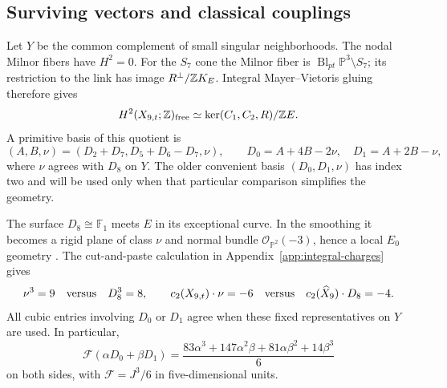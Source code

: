 \subsection{Surviving vectors and classical couplings}

Let $Y$ be the common complement of small singular neighborhoods.
The nodal Milnor fibers have $H^2=0$. For the $S_7$ cone the Milnor
fiber is $\operatorname{Bl}_{pt}\mathbb P^3\setminus S_7$;
its restriction to the link has image $R^\perp/\mathbb Z K_E$.
Integral Mayer--Vietoris gluing therefore gives
\begin{equation}
 H^2(X_{9,t};\mathbb Z)_{\rm free}
 \simeq \ker(C_1,C_2,R)/\mathbb Z E.
 \label{eq:x9-smooth-h2}
\end{equation}
A primitive basis of this quotient is
\begin{equation}
 (A,B,\nu)=(D_2+D_7,D_5+D_6-D_7,\nu),\qquad
 D_0=A+4B-2\nu,\quad D_1=A+2B-\nu,
 \label{eq:x9-primitive-smooth-basis}
\end{equation}
where $\nu$ agrees with $D_8$ on $Y$. The older convenient basis
$(D_0,D_1,\nu)$ has index two and will be used only when that
particular comparison simplifies the geometry.

The surface $D_8\cong\mathbb F_1$ meets $E$ in its exceptional
curve. In the smoothing it becomes a rigid plane of class $\nu$
and normal bundle $\mathcal O_{\mathbb P^2}(-3)$, hence a local
$E_0$ geometry \cite{Morrison:1996pp}. The cut-and-paste calculation
in Appendix~\ref{app:integral-charges} gives
\begin{equation}
 \nu^3=9\quad\hbox{versus}\quad D_8^3=8,\qquad
 c_2(X_{9,t})\cdot\nu=-6\quad\hbox{versus}\quad
 c_2(\widehat X_9)\cdot D_8=-4.
 \label{eq:x9-smooth-cubic}
\end{equation}
All cubic entries involving $D_0$ or $D_1$ agree when these fixed
representatives on $Y$ are used. In particular,
\begin{equation}
 \mathcal F(\alpha D_0+\beta D_1)
 =\frac{83\alpha^3+147\alpha^2\beta+81\alpha\beta^2+14\beta^3}{6}
 \label{eq:x9-inherited-cubic}
\end{equation}
on both sides, with $\mathcal F=J^3/6$ in five-dimensional units.

